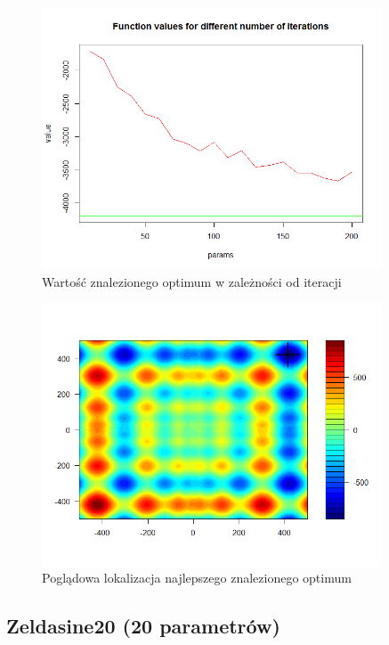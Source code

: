 \documentclass[11pt, a4paper]{article}
\begin{document}
\begin{figure}[H]
	\begin{center}
		\includegraphics[width=0.9\textwidth]{./assets/Schwefel6.png} %
		\caption{Wartość znalezionego optimum w zależności od iteracji}
		\label{fig:gulf7}
	\end{center}
\end{figure}
\begin{figure}[H]
	\begin{center}
		\includegraphics[width=0.9\textwidth]{./assets/Schwefel7.png} %
		\caption{Poglądowa lokalizacja najlepszego znalezionego optimum}
		\label{fig:gulf7}
	\end{center}
\end{figure}


\subsection{Zeldasine20 (20 parametrów)}
\end{document}
